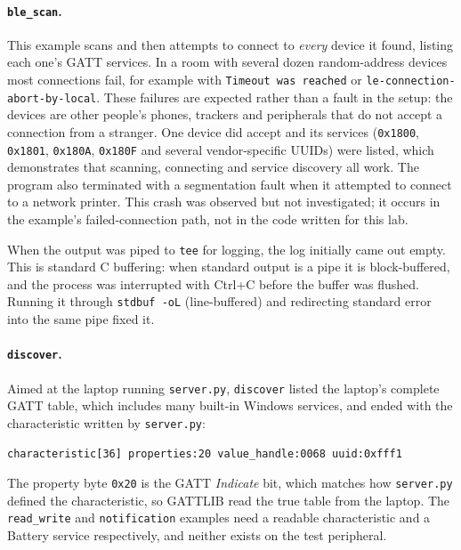 \documentclass[11pt,a4paper]{article}
\begin{document}
\paragraph{\texttt{ble\_scan}.} This example scans and then attempts to
connect to \emph{every} device it found, listing each one's GATT services. In
a room with several dozen random-address devices most connections fail, for
example with \texttt{Timeout was reached} or
\texttt{le-connection-abort-by-local}. These failures are expected rather than
a fault in the setup: the devices are other people's phones, trackers and
peripherals that do not accept a connection from a stranger. One device did
accept and its services (\texttt{0x1800}, \texttt{0x1801}, \texttt{0x180A},
\texttt{0x180F} and several vendor-specific UUIDs) were listed, which
demonstrates that scanning, connecting and service discovery all work. The
program also terminated with a segmentation fault when it attempted to connect
to a network printer. This crash was observed but not investigated; it occurs
in the example's failed-connection path, not in the code written for this lab.

When the output was piped to \texttt{tee} for logging, the log initially came
out empty. This is standard C buffering: when standard output is a pipe it is
block-buffered, and the process was interrupted with Ctrl+C before the buffer
was flushed. Running it through \texttt{stdbuf -oL} (line-buffered) and
redirecting standard error into the same pipe fixed it.

\paragraph{\texttt{discover}.} Aimed at the laptop running
\texttt{server.py}, \texttt{discover} listed the laptop's complete GATT
table, which includes many built-in Windows services, and ended with the
characteristic written by \texttt{server.py}:

\begin{lstlisting}[style=shellstyle,caption={The last line of \texttt{discover}'s output.}]
characteristic[36] properties:20 value_handle:0068 uuid:0xfff1
\end{lstlisting}

The property byte \texttt{0x20} is the GATT \emph{Indicate} bit, which
matches how \texttt{server.py} defined the characteristic, so GATTLIB read the
true table from the laptop. The \texttt{read\_write} and \texttt{notification}
examples need a readable characteristic and a Battery service respectively, and
neither exists on the test peripheral.
\end{document}
